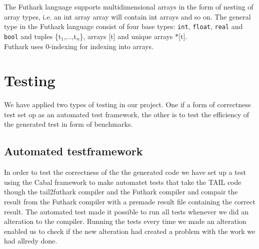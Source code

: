 \documentclass[11pt]{article}
\begin{document}
The Futhark language supports multidimensional arrays in the form of nesting of array types,
i.e. an int array array will contain int arrays and so on.
The general type in the Futhark language consist of four base types: {\tt int}, {\tt float}, {\tt real} and {\tt bool} and tuples \{t$_1$,...,t$_n$\}, arrays [t] and unique arrays *[t].\\

Futhark uses 0-indexing for indexing into arrays.\\ %





\section{Testing}
We have applied two types of testing in our project. One if a form of correctness test set op as an automated test
framework, the other is to test the efficiency of the generated test in form of benchmarks. 

\subsection{Automated testframework}
In order to test the correctness of the the generated code we have set up a test using the Cabal framework to make automatet tests that take the TAIL code though the tail2futhark compiler and the Futhark compiler and compair the result from the Futhark compiler with a premade result file containing the correct result. The automated test made it possible to run all tests whenever we did an alteration to the compiler. 
Running the tests every time we made an alteration enabled us to check if the new alteration had created a problem with the work we had allredy done. \\
\end{document}
